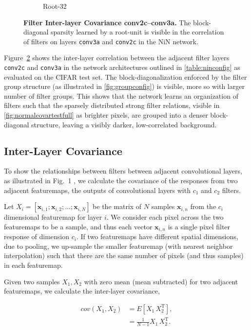 \documentclass[thesis]{subfiles}
\begin{document}
{\begin{landscape}
\begin{figure}[p]
\begin{subfigure}[b]{0.32\linewidth}
				\caption{Root-32}
				\label{fig:root32corrfull}
			\end{subfigure}
			\caption{\textbf{Filter Inter-layer Covariance conv2c--conv3a.} The block-diagonal sparsity learned by a root-unit is visible in the correlation of filters on layers \texttt{conv3a} and \texttt{conv2c} in the NiN network.}
			\label{fig:covar}
		\end{figure}
	\end{landscape}}
	
	Figure~\ref{fig:covar} shows the inter-layer correlation between the adjacent filter layers \texttt{conv2c} and \texttt{conv3a} in the network architectures outlined in \cref{table:ninconfig} as evaluated on the CIFAR test set. The block-diagonalization enforced by the filter group structure (as illustrated in \cref{fig:groupconfig}) is visible, more so with larger number of filter groups. This shows that the network learns an organization of filters such that the sparsely distributed strong filter relations, visible in \ref{fig:normalcovartestfull} as brighter pixels, are grouped into a denser block-diagonal structure, leaving a visibly darker, low-correlated background.
	
	\subsection{Inter-Layer Covariance}
	\label{interlayercovar}
	To show the relationships between filters between adjacent convolutional layers, as illustrated in Fig.~1
	, we calculate the covariance of the responses from two adjacent featuremaps, the outputs of convolutional layers with $c_1$ and $c_2$ filters.
	
	Let $X_i = [\mathbf{x}_{i,1}; \mathbf{x}_{i,2}; \ldots ; \mathbf{x}_{i,N}]$ be the matrix of $N$ samples $\mathbf{x}_{i,n}$ from the $c_i$ dimensional featuremap for layer $i$. We consider each pixel across the two featuremaps to be a sample, and thus each vector $\mathbf{x}_{i,n}$ is a single pixel filter response of dimension $c_i$. If two featuremaps have different spatial dimensions, due to pooling, we up-sample the smaller featuremap (with nearest neighbor interpolation) such that there are the same number of pixels (and thus samples) in each featuremap.
	
	Given two samples $X_1, X_2$ with zero mean (\ie mean subtracted) for two adjacent featuremaps, we calculate the inter-layer covariance,
	
	\begin{align}
	cov(X_1, X_2) &= E\left[X_1\,X_2^\textrm{T}\right],\\
	&= \frac{1}{N-1} X_1\,X_2^\textrm{T}.
	\end{align}
	
\end{document}

